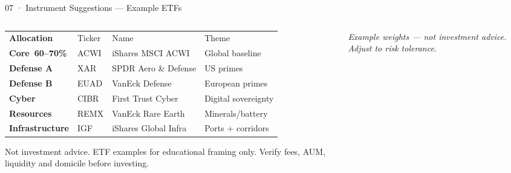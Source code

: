 \documentclass[aspectratio=169,10pt]{beamer}
\newcommand{\src}[1]{{\vspace{1pt}\par\raggedright\tiny\color{steel}\itshape #1}}
\newcommand{\er}{{\textcolor{navy}{\rule{16pt}{2.5pt}}}\enspace}
\begin{document}
\begin{frame}{07 · Instrument Suggestions — Example ETFs}
\begin{columns}[T,totalwidth=\textwidth]

\begin{column}{0.57\textwidth}
\renewcommand{\arraystretch}{1.28}
\setlength{\tabcolsep}{3pt}
\begin{tabular}{>{\scriptsize\bfseries}p{1.8cm}%
                >{\scriptsize\ttfamily}p{1.2cm}%
                >{\scriptsize}p{2.0cm}%
                >{\scriptsize}p{1.5cm}}
  \rowcolor{navy}
    \color{white}Allocation & \color{white}Ticker & \color{white}Name & \color{white}Theme \\
  \rowcolor{ice}
    Core\ 60–70\% & ACWI & iShares MSCI ACWI & Global baseline \\
  Defense A & XAR & SPDR Aero \& Defense & US primes \\
  \rowcolor{ice}
    Defense B & EUAD & VanEck Defense & European primes \\
  Cyber & CIBR & First Trust Cyber & Digital sovereignty \\
  \rowcolor{ice}
    Resources & REMX & VanEck Rare Earth & Minerals/battery \\
  Infrastructure & IGF & iShares Global Infra & Ports + corridors \\
\end{tabular}
\vspace{4pt}
{\tiny\color{coal}
  Not investment advice. ETF examples for educational framing only.
  Verify fees, AUM, liquidity and domicile before investing.}
\end{column}

\begin{column}{0.43\textwidth}
\src{Example weights — not investment advice. Adjust to risk tolerance.}
\end{column}

\end{columns}
\end{frame}
\end{document}
